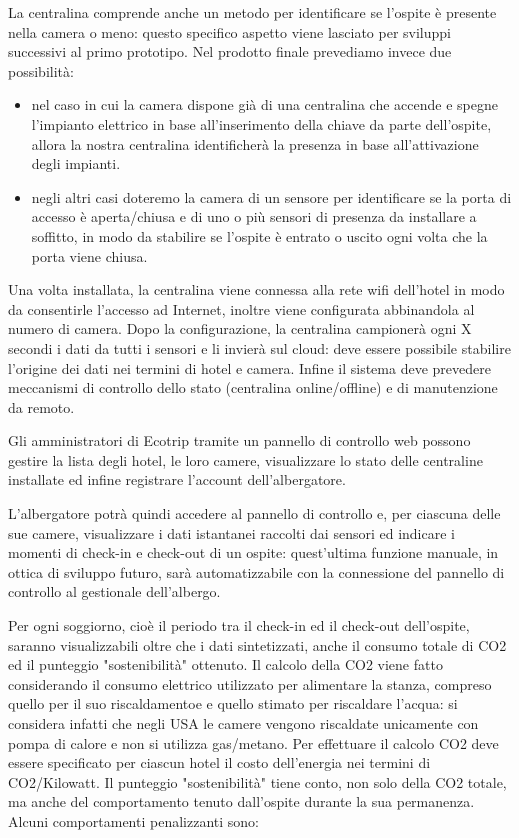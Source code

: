 La centralina comprende anche un metodo per identificare se l'ospite
è presente nella camera o meno: questo specifico aspetto viene lasciato per
sviluppi successivi al primo prototipo. Nel prodotto finale
prevediamo invece due possibilità:
\begin{itemize}
    \item nel caso in cui la camera dispone già di una centralina che accende e spegne
    l'impianto elettrico in base all'inserimento della chiave da parte
    dell'ospite, allora la nostra centralina identificherà la presenza in base
    all'attivazione degli impianti.
    \item negli altri casi doteremo la camera di un sensore per identificare se la porta
    di accesso è aperta/chiusa e di uno o più sensori di presenza da installare a
    soffitto, in modo da stabilire se l'ospite è entrato o uscito ogni volta che
    la porta viene chiusa.
\end{itemize}

Una volta installata, la centralina viene connessa alla rete wifi dell'hotel in
modo da consentirle l'accesso ad Internet, inoltre viene configurata abbinandola
al numero di camera. Dopo la configurazione, la centralina campionerà ogni X
secondi i dati da tutti i sensori e li invierà sul cloud: deve essere possibile
stabilire l'origine dei dati nei termini di hotel e camera. Infine il sistema
deve prevedere meccanismi di controllo dello stato (centralina online/offline) e
di manutenzione da remoto.

Gli amministratori di Ecotrip tramite un pannello di controllo web possono
gestire la lista degli hotel, le loro camere, visualizzare lo stato delle
centraline installate ed infine registrare l'account dell'albergatore.

L'albergatore potrà quindi accedere al pannello di controllo e, per ciascuna
delle sue camere, visualizzare i dati istantanei raccolti dai sensori ed
indicare i momenti di check-in e check-out di un ospite: quest'ultima funzione
manuale, in ottica di sviluppo futuro, sarà automatizzabile con la connessione
del pannello di controllo al gestionale dell'albergo.

Per ogni soggiorno, cioè il periodo tra il check-in ed il check-out dell'ospite,
saranno visualizzabili oltre che i dati sintetizzati, anche il consumo totale di
CO2 ed il punteggio "sostenibilità" ottenuto. Il calcolo della CO2 viene fatto
considerando il consumo elettrico utilizzato per alimentare la stanza, compreso
quello per il suo riscaldamentoe e quello stimato per riscaldare l'acqua: si
considera infatti che negli USA le camere vengono riscaldate unicamente con
pompa di calore e non si utilizza gas/metano. Per effettuare il calcolo CO2 deve
essere specificato per ciascun hotel il costo dell'energia nei termini di
CO2/Kilowatt. Il punteggio "sostenibilità" tiene conto, non solo della CO2
totale, ma anche del comportamento tenuto dall'ospite durante la sua permanenza.
Alcuni comportamenti penalizzanti sono:

